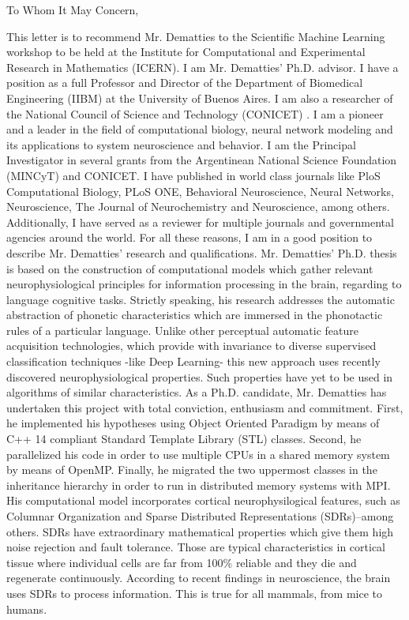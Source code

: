 \documentclass{article}
\begin{document}
To Whom It May Concern,

This letter is to recommend Mr. Dematties to the Scientific Machine Learning workshop to be held at the Institute for Computational and Experimental Research in Mathematics (ICERN). I am Mr. Dematties’ Ph.D. advisor. I have a position as a full Professor and Director of the Department of Biomedical Engineering (IIBM) at the University of Buenos Aires. I am also a researcher of the National Council of Science and Technology (CONICET) . I am a pioneer and a leader in the field of computational biology, neural network modeling and its applications to system neuroscience and behavior. I am the Principal Investigator in several grants from the Argentinean National Science Foundation (MINCyT) and CONICET. I have published in world class journals like PloS Computational Biology, PLoS ONE, Behavioral Neuroscience, Neural Networks, Neuroscience, The Journal of Neurochemistry and Neuroscience, among others. Additionally, I have served as a reviewer for multiple journals and governmental agencies around the world. For all these reasons, I am in a good position to describe Mr. Dematties’ research and qualifications.
Mr. Dematties’ Ph.D. thesis is based on the construction of computational models which gather relevant neurophysiological principles for information processing in the brain, regarding to language cognitive tasks. Strictly speaking, his research addresses the automatic abstraction of phonetic characteristics which are immersed in the phonotactic rules of a particular language. Unlike other perceptual automatic feature acquisition technologies, which provide with invariance to diverse supervised classification techniques -like Deep Learning- this new approach uses recently discovered neurophysiological properties. Such properties have yet to be used in algorithms of similar characteristics.
As a Ph.D. candidate, Mr. Dematties has undertaken this project with total conviction, enthusiasm and commitment. First, he implemented his hypotheses using Object Oriented Paradigm by means of C++ 14 compliant Standard Template Library (STL) classes. Second, he parallelized his code in order to use multiple CPUs in a shared memory system by means of OpenMP. Finally, he migrated the two uppermost classes in the inheritance hierarchy in order to run in distributed memory systems with MPI.  His computational model incorporates cortical neurophysilogical features, such as Columnar Organization and Sparse Distributed Representations (SDRs)--among others. SDRs have extraordinary mathematical properties which give them high noise rejection and fault tolerance. Those are typical characteristics in cortical tissue where individual cells are far from 100\% reliable and they die and regenerate continuously. According to recent findings in neuroscience, the brain uses SDRs to process information. This is true for all mammals, from mice to humans.
\end{document}
